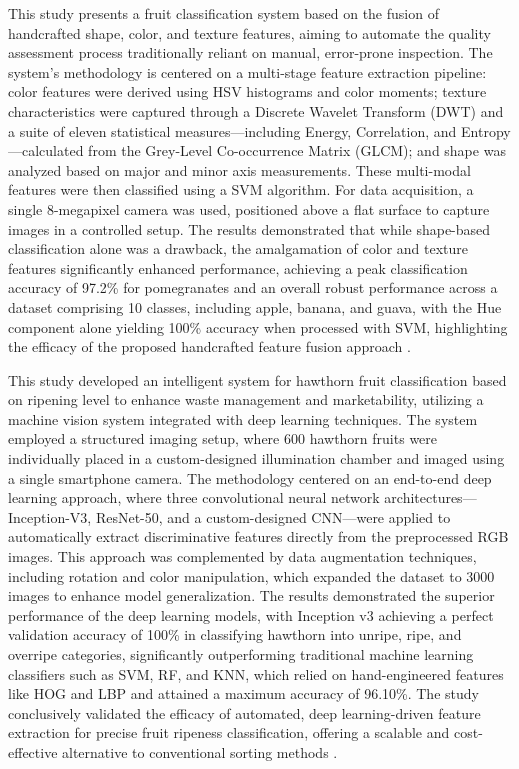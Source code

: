 {

This study presents a fruit classification system based on the fusion of handcrafted shape, color, and texture features, aiming to automate the quality assessment process traditionally reliant on manual, error-prone inspection. The system's methodology is centered on a multi-stage feature extraction pipeline: color features were derived using HSV histograms and color moments; texture characteristics were captured through a Discrete Wavelet Transform (DWT) and a suite of eleven statistical measures—including Energy, Correlation, and Entropy—calculated from the Grey-Level Co-occurrence Matrix (GLCM); and shape was analyzed based on major and minor axis measurements. These multi-modal features were then classified using a SVM algorithm. For data acquisition, a single 8-megapixel camera was used, positioned above a flat surface to capture images in a controlled setup. The results demonstrated that while shape-based classification alone was a drawback, the amalgamation of color and texture features significantly enhanced performance, achieving a peak classification accuracy of 97.2\% for pomegranates and an overall robust performance across a dataset comprising 10 classes, including apple, banana, and guava, with the Hue component alone yielding 100\% accuracy when processed with SVM, highlighting the efficacy of the proposed handcrafted feature fusion approach \citep{Chandra2024}.


This study developed an intelligent system for hawthorn fruit classification based on ripening level to enhance waste management and marketability, utilizing a machine vision system integrated with deep learning techniques. The system employed a structured imaging setup, where 600 hawthorn fruits were individually placed in a custom-designed illumination chamber and imaged using a single smartphone camera. The methodology centered on an end-to-end deep learning approach, where three convolutional neural network architectures—Inception-V3, ResNet-50, and a custom-designed CNN—were applied to automatically extract discriminative features directly from the preprocessed RGB images. This approach was complemented by data augmentation techniques, including rotation and color manipulation, which expanded the dataset to 3000 images to enhance model generalization. The results demonstrated the superior performance of the deep learning models, with Inception v3 achieving a perfect validation accuracy of 100\% in classifying hawthorn into unripe, ripe, and overripe categories, significantly outperforming traditional machine learning classifiers such as SVM, RF, and KNN, which relied on hand-engineered features like HOG and LBP and attained a maximum accuracy of 96.10\%. The study conclusively validated the efficacy of automated, deep learning-driven feature extraction for precise fruit ripeness classification, offering a scalable and cost-effective alternative to conventional sorting methods \citep{Azadnia2023}.

}
